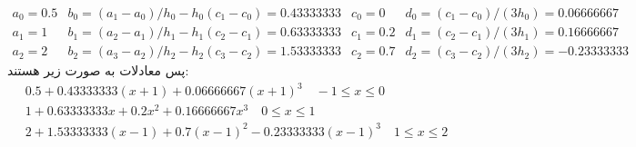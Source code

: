 \documentclass[]{article}
\begin{document}
\[
\begin{array}{cccc}
    a_0 = 0.5 & b_0 = (a_1 - a_0)/h_0 - h_0 (c_1-c_0) = 0.43333333 & c_0 = 0 & d_0 = (c_1 - c_0) / (3h_0) = 0.06666667\\
    a_1 = 1 & b_1 = (a_2 - a_1)/h_1 - h_1 (c_2-c_1) = 0.63333333 & c_1 = 0.2 & d_1 = (c_2 - c_1) / (3h_1) = 0.16666667\\
    a_2 = 2 & b_2 = (a_3 - a_2)/h_2 - h_2 (c_3-c_2) = 1.53333333 & c_2 = 0.7 & d_2 = (c_3 - c_2) / (3h_2) = -0.23333333
\end{array}
\]
پس معادلات به صورت زیر هستند:
\begin{gather*}
    0.5 + 0.43333333 (x + 1) + 0.06666667 (x + 1)^3 \quad -1 \le x \le 0\\
    1 + 0.63333333 x + 0.2x^2 + 0.16666667 x^3 \quad 0 \le x \le 1\\
    2 + 1.53333333 (x - 1) + 0.7 (x-1)^2 -0.23333333 (x - 1)^3 \quad 1 \le x \le 2
\end{gather*}
\end{document}
